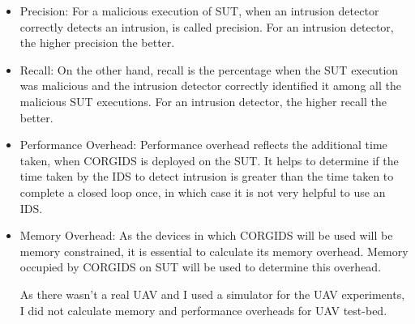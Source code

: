 \begin{itemize}
\item Precision: For a malicious execution of \ac{SUT}, when an intrusion detector correctly detects an intrusion, is called precision. For an intrusion detector, the higher precision the better.
\item Recall: On the other hand, recall is the percentage when the \ac{SUT} execution was malicious and the intrusion detector correctly identified it among all the malicious \ac{SUT} executions. For an intrusion detector, the higher recall the better.
\item Performance Overhead: Performance overhead reflects the additional time taken, when \ac{CORGIDS} is deployed on the \ac{SUT}. It helps to determine if the time taken by the \ac{IDS} to detect intrusion is greater than the time taken to complete a closed loop once, in which case it is not very helpful to use an \ac{IDS}.
\item Memory Overhead: As the devices in which \ac{CORGIDS} will be used will be memory constrained, it is essential to calculate its memory overhead. Memory occupied by \ac{CORGIDS} on \ac{SUT} will be used to determine this overhead.

As there wasn't a real \ac{UAV} and I used a simulator for the \ac{UAV} experiments, I did not calculate memory and performance overheads for \ac{UAV} test-bed.
\end{itemize}


\begin{table}
\centering
  \caption{False Positive and False Negative obtained for CORGIDS on the two test-beds}
  \label{tab:results}
\end{table}


